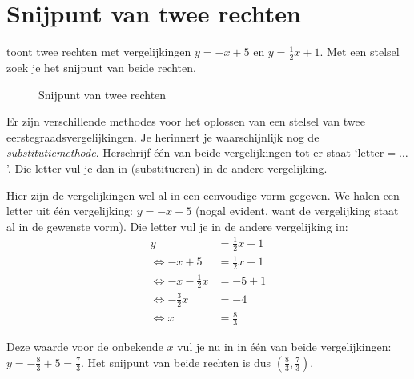\section{Snijpunt van twee rechten}
 toont twee rechten met vergelijkingen $y=-x+5$ en $y=\frac{1}{2}x+1$. Met een stelsel zoek je het snijpunt van beide rechten. 
\begin{figure}[htbp]
    \centering
{}
\caption{Snijpunt van twee rechten}
    \label{fig:snijdenderechten}
\end{figure}

Er zijn verschillende methodes voor het oplossen van een stelsel van twee eerstegraadsvergelijkingen. Je herinnert je waarschijnlijk nog de \emph{substitutiemethode}. Herschrijf één van beide vergelijkingen tot er staat `$\text{letter} = \ldots$'. Die letter vul je dan in (substitueren) in de andere vergelijking.

Hier zijn de vergelijkingen wel al in een eenvoudige vorm gegeven. We halen een letter uit één vergelijking: $y=-x+5$ (nogal evident, want de vergelijking staat al in de gewenste vorm). Die letter vul je in de andere vergelijking in:
\begin{align*}
y&=\frac{1}{2}x+1\\
\Leftrightarrow -x+5&=\frac{1}{2}x+1\\
\Leftrightarrow -x-\frac{1}{2}x&=-5+1\\
\Leftrightarrow -\frac{3}{2}x&=-4\\
\Leftrightarrow x&=\frac{8}{3}
\end{align*}

Deze waarde voor de onbekende $x$ vul je nu in in één van beide vergelijkingen: $y=-\frac{8}{3}+5=\frac{7}{3}$. Het snijpunt van beide rechten is dus $(\frac{8}{3},\frac{7}{3})$.


